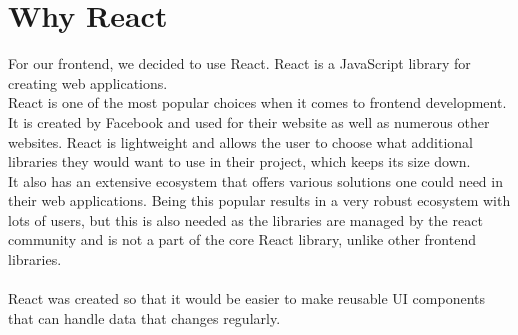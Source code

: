\section{Why React}
For our frontend, we decided to use React.
React is a JavaScript library for creating web applications\cite{ReactJS}. 
\\
React is one of the most popular choices when it comes to frontend development\cite{NPMVueReactAngular}.
It is created by Facebook and used for their website as well as numerous other websites\cite{ReactHistory}.
React is lightweight and allows the user to choose what additional libraries they would want to use in their project, which keeps its size down.
\\
It also has an extensive ecosystem that offers various solutions one could need in their web applications.
Being this popular results in a very robust ecosystem with lots of users, but this is also needed as the libraries are managed by the react community and is not a part of the core React library, unlike other frontend libraries\cite{Vue}.
\\\\
React was created so that it would be easier to make reusable UI components that can handle data that changes regularly\cite{ReactHistory}.